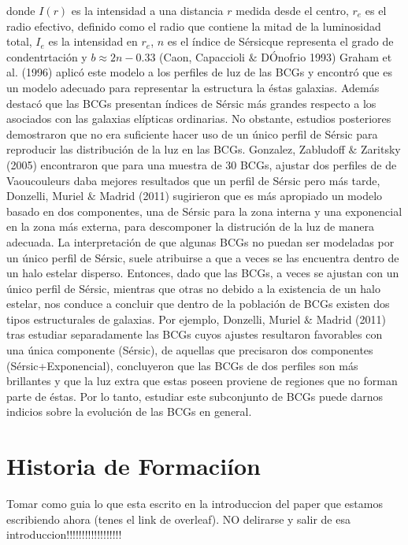 donde $I(r)$ es la intensidad a una distancia $r$ medida desde el centro, $r_{e}$ es el radio efectivo, definido como
el radio que contiene la mitad de la luminosidad total, $I_{e}$ es la intensidad en $r_{e}$, $n$ es el \'indice de
S\'ersicque representa el grado de condentrtaci\'on y $b \approx 2n-0.33$ (Caon, Capaccioli $\&$ D\' Onofrio 1993) 
Graham et al. (1996) aplic\'o este modelo a los perfiles de luz de las BCGs y encontr\'o que es un modelo
adecuado para representar la estructura la \'estas galaxias. Adem\'as destac\'o que las BCGs presentan \'indices de
S\'ersic m\'as grandes respecto a los asociados con las galaxias el\'ipticas ordinarias. 
No obstante, estudios posteriores demostraron que no era suficiente hacer uso de un \'unico perfil
de S\'ersic para reproducir las distribuci\'on de la luz en las BCGs. Gonzalez, Zabludoff $\&$ Zaritsky (2005)
encontraron que para una muestra de 30 BCGs, ajustar dos perfiles de de Vaoucouleurs daba mejores resultados que
un perfil de S\'ersic pero m\'as tarde,  Donzelli, Muriel $\&$ Madrid (2011) sugirieron que es m\'as apropiado
un modelo basado en dos componentes, una de S\'ersic para la zona interna y una exponencial en la zona m\'as
externa, para descomponer la distruci\'on de la luz de manera adecuada. La interpretaci\'on
de que algunas BCGs no puedan ser modeladas por un \'unico perfil de S\'ersic, suele atribuirse
a que a veces se las encuentra dentro de un halo estelar disperso.
Entonces, dado que las BCGs, a veces se ajustan con un \'unico perfil de S\'ersic, mientras que otras no debido
a la existencia de un halo estelar,
nos conduce a concluir que dentro de la poblaci\'on de BCGs existen dos tipos estructurales de galaxias.
Por ejemplo, Donzelli, Muriel $\&$ Madrid (2011)
tras estudiar separadamente las BCGs cuyos ajustes resultaron favorables con una \'unica componente
(S\'ersic), de aquellas que precisaron dos componentes (S\'ersic+Exponencial), concluyeron
que las BCGs de dos perfiles son m\'as brillantes y que la luz extra que estas poseen 
proviene de regiones que no forman parte de \'estas.
Por lo tanto, estudiar este subconjunto de BCGs puede darnos indicios sobre la evoluci\'on de las BCGs en general.




\section{Historia de Formaci\'ion}\label{sec:segunda}
Tomar como guia lo que esta escrito en la introduccion del paper que estamos escribiendo ahora (tenes el link de overleaf). NO delirarse y salir de esa introduccion!!!!!!!!!!!!!!!!!! 

